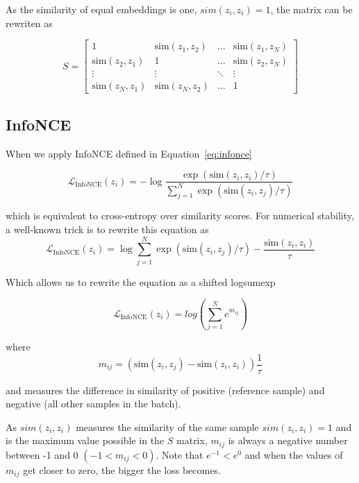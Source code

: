 \documentclass[letterpaper]{article} %
\begin{document}
As the similarity of equal embeddings is one, $sim(z_i,z_i)=1$, the matrix can be rewriten as

\begin{equation}
S = 
\begin{bmatrix}
1 & \mathrm{sim}(z_1, z_2) & \dots & \mathrm{sim}(z_1, z_N) \\
\mathrm{sim}(z_2, z_1) & 1 & \dots & \mathrm{sim}(z_2, z_N) \\
\vdots & \vdots & \ddots & \vdots \\
\mathrm{sim}(z_N, z_1) & \mathrm{sim}(z_N, z_2) & \dots & 1
\end{bmatrix}
\end{equation}

\subsection{InfoNCE}
When we apply InfoNCE defined in Equation~\ref{eq:infonce}


\begin{equation}\label{eq:infonce}
\mathcal{L}_{\text{InfoNCE}} (z_i) = -\log \frac{ \exp(\text{sim}(z_i, z_i)/\tau) }{ \sum_{j=1}^{N} \exp(\text{sim}(z_i, z_j)/\tau) }
\end{equation}


which is equivalent to cross-entropy over similarity scores. For numerical stability, a well-known trick is to rewrite this equation as
\begin{equation}\label{eq:implemented}
\mathcal{L}_{\text{InfoNCE}}(z_i) = \log \sum_{j=1}^{N} \exp(\text{sim}(z_i, z_j)/\tau) - \frac{\text{sim}(z_i,z_i)}{\tau}
\end{equation}


Which allows us  to rewrite the equation as a shifted logsumexp

\begin{equation}\label{eq:shifted}
\mathcal{L}_{\text{InfoNCE}} (z_i) =  log \left( \sum_{j=1}^N e^{m_{ij}} \right) 
\end{equation}

where 
\begin{equation}
m_{ij}= (\text{sim}(z_i, z_j) - \text{sim}(z_i,z_i)) \frac{1}{\tau}
\end{equation}

and measures the difference in similarity of positive (reference sample) and negative (all other samples in the batch). 

As $sim(z_i,z_i)$ measures the similarity of the same sample $sim(z_i,z_i)=1$  and is the maximum value possible in the $S$ matrix, $m_{ij}$ is always a negative number between -1 and 0 $(-1<m_{ij}<0)$. Note that $e^{-1} < e^0 $ and when the values of $m_{ij}$ get closer to zero, the bigger the loss becomes.  
\end{document}
